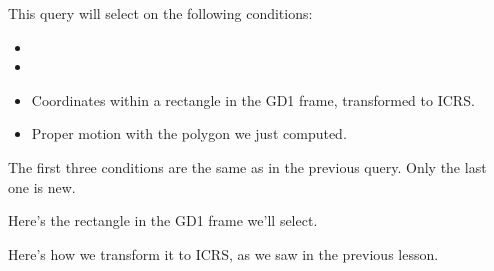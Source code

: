 \documentclass[letterpaper,10pt,english]{sphinxmanual}
\begin{document}
This query will select on the following conditions:
\begin{itemize}
\item {} 

\item {} 

\item {} 
Coordinates within a rectangle in the GD\sphinxhyphen{}1 frame, transformed to ICRS.

\item {} 
Proper motion with the polygon we just computed.

\end{itemize}

The first three conditions are the same as in the previous query.  Only the last one is new.

Here’s the rectangle in the GD\sphinxhyphen{}1 frame we’ll select.

\begin{sphinxVerbatim}[commandchars=\\\{\}]
  
  
  
  
\end{sphinxVerbatim}

\begin{sphinxVerbatim}[commandchars=\\\{\}]
  \PYG{p}{[}   \PYG{p}{]}  
  \PYG{p}{[}   \PYG{p}{]}  
\end{sphinxVerbatim}

Here’s how we transform it to ICRS, as we saw in the previous lesson.

\begin{sphinxVerbatim}[commandchars=\\\{\}]
   
   

   
  
\end{sphinxVerbatim}
\end{document}
